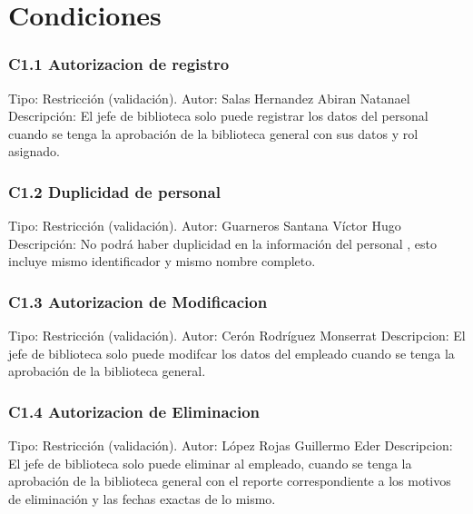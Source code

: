 \chapter{Condiciones}
\label{appendix:Condiciones}

\subsection{C1.1 Autorizacion de registro}
	\UCli Tipo: Restricción (validación).
	\UCli Autor: Salas Hernandez Abiran Natanael
	\UCli Descripción: El jefe de biblioteca solo puede registrar los datos del personal cuando se tenga la aprobación de la biblioteca general con sus datos y rol asignado.

\subsection{C1.2 Duplicidad de personal}
	\UCli Tipo: Restricción (validación).
	\UCli Autor: Guarneros Santana Víctor Hugo
	\UCli Descripción: No podrá haber duplicidad en la información del personal , esto incluye mismo identificador y mismo nombre completo.

\subsection{C1.3 Autorizacion de Modificacion}
	\UCli Tipo: Restricción (validación).
	\UCli Autor: Cerón Rodríguez Monserrat
	\UCli Descripcion: El jefe de biblioteca solo puede modifcar los datos del empleado cuando se tenga la aprobación de la biblioteca general.

\subsection{C1.4 Autorizacion de Eliminacion}
	\UCli Tipo: Restricción (validación).
	\UCli Autor: López Rojas Guillermo Eder 
	\UCli Descripcion: El jefe de biblioteca solo puede eliminar al empleado, cuando se tenga la aprobación de la biblioteca general con el reporte correspondiente a los motivos de eliminación y las fechas exactas de lo mismo.


















